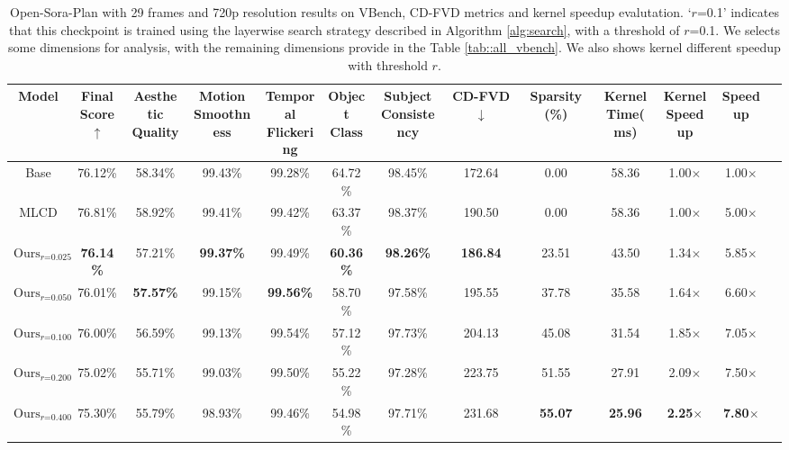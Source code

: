 \begin{table*}[t]
\scriptsize \centering
\caption{Open-Sora-Plan with 29 frames and 720p resolution results on VBench, CD-FVD metrics and kernel speedup evalutation. 
`$r$=0.1' indicates that this checkpoint is trained using the layerwise search strategy described in Algorithm \ref{alg:search}, with a threshold of $r$=0.1. We selects some dimensions for analysis, with the remaining dimensions provide in the Table \ref{tab::all_vbench}. We also shows kernel different speedup with threshold $r$. } 
\label{tab:main_result}
\setlength{\tabcolsep}{4pt}

\begin{tabular}{ccccccccccccc}
\toprule 
\textbf{Model} & \makecell{\textbf{Final} \\ \textbf{Score}} $\uparrow$&  \makecell{\textbf{Aesthetic} \\ \textbf{Quality}} & \makecell{\textbf{Motion} \\ \textbf{Smoothness}} & \makecell{\textbf{Temporal} \\ \textbf{Flickering}} & \makecell{\textbf{Object} \\ \textbf{Class}} & \makecell{\textbf{Subject} \\ \textbf{Consistency}} & \textbf{CD-FVD} $\downarrow$ & \textbf{Sparsity (\%)} & \makecell{\textbf{Kernel} \\ \textbf{Time(ms)}} & \makecell{\textbf{Kernel} \\ \textbf{Speedup}} & \textbf{Speedup} \\
 
\midrule
Base & 76.12\% & 58.34\% & 99.43\% & 99.28\% & 64.72\% & 98.45\% & 172.64 & 0.00 & 58.36 & 1.00$\times$& 1.00$\times$ \\ 
MLCD & 76.81\% & 58.92\% & 99.41\% & 99.42\% & 63.37\% & 98.37\% & 190.50 & 0.00 & 58.36 & 1.00$\times$& 5.00$\times$ \\ 
\midrule
$\text{Ours}_{r\text{=0.025}}$& \textbf{76.14\%} & 57.21\% & \textbf{99.37\%} & 99.49\% & \textbf{60.36\%} & \textbf{98.26\%} & \textbf{186.84} & 23.51 & 43.50 & 1.34$\times$& 5.85$\times$ \\ 
$\text{Ours}_{r\text{=0.050}}$& 76.01\% &  \textbf{57.57\%} & 99.15\% &\textbf{99.56\%} & 58.70\% & 97.58\% & 195.55 & 37.78 & 35.58 & 1.64$\times$ & 6.60$\times$ \\ 
$\text{Ours}_{r\text{=0.100}}$ & 76.00\% & 56.59\% & 99.13\% & 99.54\% & 57.12\% & 97.73\% & 204.13 & 45.08 & 31.54 & 1.85$\times$ & 7.05$\times$ \\ 
$\text{Ours}_{r\text{=0.200}}$ & 75.02\% & 55.71\% & 99.03\% & 99.50\% & 55.22\% & 97.28\% & 223.75 & 51.55 & 27.91 & 2.09$\times$ & 7.50$\times$ \\ 
$\text{Ours}_{r\text{=0.400}}$& 75.30\% & 55.79\% & 98.93\% & 99.46\% & 54.98\% & 97.71\% & 231.68 & \textbf{55.07} & \textbf{25.96} & \textbf{2.25$\times$} & \textbf{7.80$\times$} \\ 
\midrule
\end{tabular}
\end{table*}



